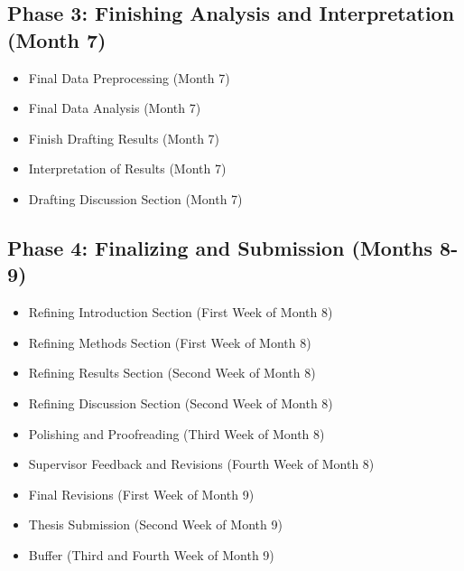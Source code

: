 \documentclass[12pt]{article} %
\begin{document}
\subsection{Phase 3: Finishing Analysis and Interpretation (Month 7)}
\begin{itemize}
    \item Final Data Preprocessing (Month 7)
    \item Final Data Analysis (Month 7)
    \item Finish Drafting Results (Month 7)
    \item Interpretation of Results (Month 7)
    \item Drafting Discussion Section (Month 7)
\end{itemize}

\subsection{Phase 4: Finalizing and Submission (Months 8-9)}
\begin{itemize}
    \item Refining Introduction Section (First Week of Month 8)
    \item Refining Methods Section (First Week of Month 8)
    \item Refining Results Section (Second Week of Month 8)
    \item Refining Discussion Section (Second Week of Month 8)
    \item Polishing and Proofreading (Third Week of Month 8)
    \item Supervisor Feedback and Revisions (Fourth Week of Month 8)
    \item Final Revisions (First Week of Month 9)
    \item Thesis Submission (Second Week of Month 9)
    \item Buffer (Third and Fourth Week of Month 9)
\end{itemize}

\newpage
{} %
\printbibliography %
\end{document}
